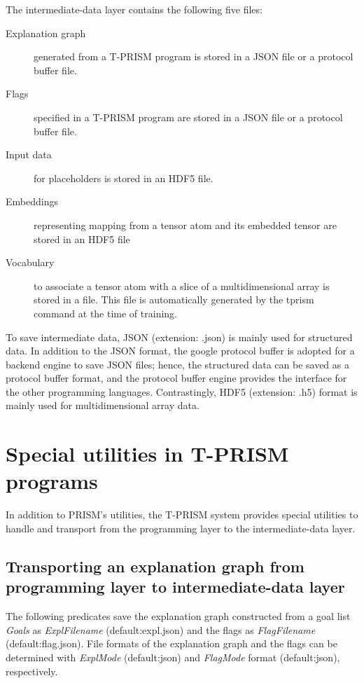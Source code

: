 \documentclass[a4paper]{report}
\begin{document}
The intermediate-data layer contains the following five files:
\begin{description}
	\item[Explanation graph] generated from a T-PRISM program is stored in a JSON file or a protocol buffer file.
	\item[Flags] specified in a T-PRISM program are stored in a JSON file or a protocol buffer file.
	\item[Input data] for placeholders is stored in an HDF5 file.
	\item[Embeddings] representing mapping from a tensor atom and its embedded tensor are stored in an HDF5 file
	\item[Vocabulary] to associate a tensor atom with a slice of a multidimensional array is stored in a file. This file is automatically generated by the tprism command at the time of training.
\end{description}
To save intermediate data, JSON (extension: .json) is mainly used for structured data.
In addition to the JSON format,
the google protocol buffer is adopted for a backend engine to save JSON files; hence, the structured data can be saved as a protocol buffer format, and the protocol buffer engine provides the interface for the other programming languages.
Contrastingly, HDF5 (extension: .h5) format is mainly used for multidimensional array data.


\section{Special utilities in T-PRISM programs}
\label{sec:tprism_predicate}

In addition to PRISM's utilities, the T-PRISM system provides special utilities to handle and transport from the programming layer to the intermediate-data layer.

\subsection{Transporting an explanation graph from programming layer to intermediate-data layer}

The following predicates save the explanation graph constructed from a goal list {\it Goals}
as {\it ExplFilename} (default:expl.json) and the flags as {\it FlagFilename} (default:flag.json).
File formats of the explanation graph and the flags can be determined with  
 {\it ExplMode} (default:json) and {\it FlagMode} format (default:json), respectively.
\end{document}
